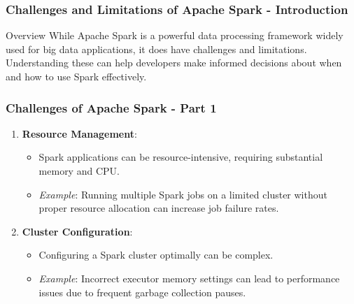 \documentclass[aspectratio=169]{beamer}
\begin{document}
\begin{frame}[fragile]
    \frametitle{Challenges and Limitations of Apache Spark - Introduction}
    \begin{block}{Overview}
        While Apache Spark is a powerful data processing framework widely used for big data applications, it does have challenges and limitations. Understanding these can help developers make informed decisions about when and how to use Spark effectively.
    \end{block}
\end{frame}

\begin{frame}[fragile]
    \frametitle{Challenges of Apache Spark - Part 1}
    \begin{enumerate}
        \item \textbf{Resource Management}:
            \begin{itemize}
                \item Spark applications can be resource-intensive, requiring substantial memory and CPU.
                \item \textit{Example}: Running multiple Spark jobs on a limited cluster without proper resource allocation can increase job failure rates.
            \end{itemize}
        
        \item \textbf{Cluster Configuration}:
            \begin{itemize}
                \item Configuring a Spark cluster optimally can be complex.
                \item \textit{Example}: Incorrect executor memory settings can lead to performance issues due to frequent garbage collection pauses.
            \end{itemize}
    \end{enumerate}
\end{frame}
\end{document}
